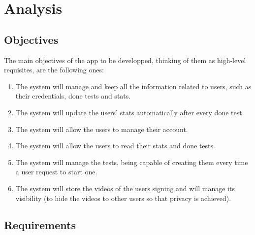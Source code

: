 \chapter{Analysis}

\section{Objectives}
The main objectives of the app to be developped, thinking of them as high-level requisites, are the following ones: 

\begin{enumerate}[label=\textbf{Obj\_\arabic*:}, align=left, leftmargin=*]
    \item The system will manage and keep all the information related to users, such as their credentials, done tests and stats.
    \item The system will update the users' stats automatically after every done test. 
    \item The system will allow the users to manage their account.
    \item The system will allow the users to read their stats and done tests.
    \item The system will manage the tests, being capable of creating them every time a user request to start one.
    \item The system will store the videos of the users signing and will manage its visibility (to hide the videos to other users so that privacy is achieved).
\end{enumerate}

\section{Requirements}
